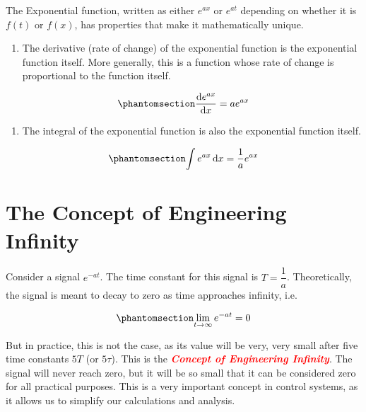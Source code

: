 \documentclass[
  14pt,
  a4paper,
  oneside,
  open=any,
  a4paper,
  14pt]{report}
\providecommand{\tightlist}{%
  \setlength{\itemsep}{0pt}\setlength{\parskip}{0pt}}\usepackage{longtable,booktabs,array}
\begin{document}
The Exponential function, written as either \(e^{ax}\) or \(e^{at}\)
depending on whether it is \(f(t)\) or \(f(x)\), has properties that
make it mathematically unique.

\begin{enumerate}
\def\labelenumi{\arabic{enumi}.}
\tightlist
\item
  The derivative (rate of change) of the exponential function is the
  exponential function itself. More generally, this is a function whose
  rate of change is proportional to the function itself.
\end{enumerate}

\begin{equation}\phantomsection\label{eq-exp-derivative}{
    \odv{e^{ax}}{x} = a e^{ax}
}\end{equation}

\begin{enumerate}
\def\labelenumi{\arabic{enumi}.}
\setcounter{enumi}{1}
\tightlist
\item
  The integral of the exponential function is also the exponential
  function itself.
\end{enumerate}

\begin{equation}\phantomsection\label{eq-exp-integral}{
    \int e^{ax} \odif{x} = \dfrac{1}{a} e^{ax} 
}\end{equation}

\section{The Concept of Engineering
Infinity}\label{the-concept-of-engineering-infinity}

Consider a signal \(e^{-at}\). The time constant for this signal is
\(T = \dfrac{1}{a}\). Theoretically, the signal is meant to decay to
zero as time approaches infinity, i.e.

\begin{equation}\phantomsection\label{eq-engineering-infinity}{
    \lim\limits_{t \to \infty} e^{-at} = 0  
}\end{equation}

But in practice, this is not the case, as its value will be very, very
small after five time constants \(5T\) (or \(5\tau\)). This is the
\textcolor{red}{\textbf{\emph{Concept of Engineering Infinity}}}. The
signal will never reach zero, but it will be so small that it can be
considered zero for all practical purposes. This is a very important
concept in control systems, as it allows us to simplify our calculations
and analysis.
\end{document}

